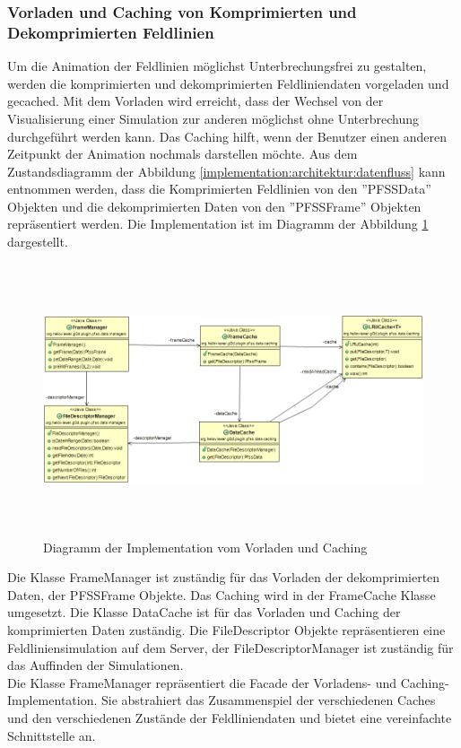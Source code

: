 \subsubsection{Vorladen und Caching von Komprimierten und Dekomprimierten Feldlinien}
Um die Animation der Feldlinien möglichst Unterbrechungsfrei zu gestalten, werden die komprimierten und dekomprimierten Feldliniendaten vorgeladen und gecached. Mit dem Vorladen wird erreicht, dass der Wechsel von der Visualisierung einer Simulation zur anderen möglichst ohne Unterbrechung durchgeführt werden kann. Das Caching hilft, wenn der Benutzer einen anderen Zeitpunkt der Animation nochmals darstellen möchte. Aus dem Zustandsdiagramm der Abbildung \ref{implementation:architektur:datenfluss} kann entnommen werden, dass die Komprimierten Feldlinien von den ''PFSSData'' Objekten und die dekomprimierten Daten von den ''PFSSFrame'' Objekten repräsentiert werden. Die Implementation ist im Diagramm der Abbildung \ref{implementation:architektur:caching} dargestellt.
\begin{figure}[!htbp]
	\center
	\includegraphics[width=1\textwidth,height=8cm,keepaspectratio]{./pictures/implementation/architectureCache.png}
	\caption{Diagramm der Implementation vom Vorladen und Caching}
	\label{implementation:architektur:caching}
\end{figure}
Die Klasse FrameManager ist zuständig für das Vorladen der dekomprimierten Daten, der PFSSFrame Objekte. Das Caching wird in der FrameCache Klasse umgesetzt. Die Klasse DataCache ist für das Vorladen und Caching der komprimierten Daten zuständig. Die FileDescriptor Objekte repräsentieren eine Feldliniensimulation auf dem Server, der FileDescriptorManager ist zuständig für das Auffinden der Simulationen.\\
Die Klasse FrameManager repräsentiert die Facade der Vorladens- und Caching- Implementation. Sie abstrahiert das Zusammenspiel der verschiedenen Caches und den verschiedenen Zustände der Feldliniendaten und bietet eine vereinfachte Schnittstelle an.\\
